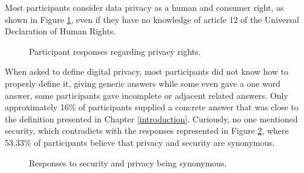 Most participants consider data privacy as a human and consumer right,
as shown in Figure \ref{fig:privacy_human_right_histogram}, even if they have
no knowledge of article 12 of the Universal Declaration of Human Rights.

\begin{figure}[H]
    \begin{center}
        \caption{Participant responses regarding privacy rights.}
        \label{fig:privacy_human_right_histogram}
    \end{center}
\end{figure}

When asked to define digital privacy, most participants did not know
how to properly define it, giving generic answers while some even gave a one word answer,
some participants gave incomplete or adjacent related answers. Only approximately
16\% of participants supplied a concrete answer that was close to the definition
presented in Chapter \ref{introduction}. Curiously, no one mentioned security,
which contradicts with the responses represented in Figure \ref{fig:security_equals_privacy},
where 53.33\% of participants believe that privacy and security are synonymous.

\begin{figure}[H]
    \centering
    \caption{Responses to security and privacy being synonymous.}
    \label{fig:security_equals_privacy}
\end{figure}

